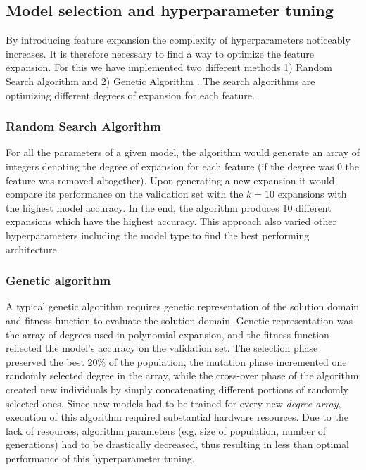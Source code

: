 \documentclass[10pt,conference,compsocconf]{IEEEtran}
\begin{document}
\subsection{Model selection and hyperparameter tuning}


\label{sec:model-selection}

By introducing feature expansion the complexity of hyperparameters noticeably increases. It is therefore necessary to find a way to optimize the feature expansion. For this we have implemented two different methods 1) Random Search algorithm and 2) Genetic Algorithm \cite{GenTut}. The search algorithms are optimizing different degrees of expansion for each feature.

\subsubsection{Random Search Algorithm}

For all the parameters of a given model, the algorithm would generate an array of integers denoting the degree of expansion for each feature (if the degree was 0 the feature was removed altogether). Upon generating a new expansion it would compare its performance on the validation set with the $k=10$ expansions with the highest model accuracy. In the end, the algorithm produces 10 different expansions which have the highest accuracy. This approach also varied other hyperparameters including the model type to find the best performing architecture.


\subsubsection{Genetic algorithm}

A typical genetic algorithm requires genetic representation of the solution domain and fitness function to evaluate the solution domain.
Genetic representation was the array of degrees used in polynomial expansion, and the fitness function reflected the model's accuracy on the validation set. The selection phase preserved the best 20\% of the population, the mutation phase incremented one randomly selected degree in the array, while the cross-over phase of the algorithm created new individuals by simply concatenating different portions of randomly selected ones. Since new models had to be trained for every new \textit{degree-array}, execution of this algorithm required substantial hardware resources. Due to the lack of resources, algorithm parameters (e.g. size of population, number of generations) had to be drastically decreased, thus resulting in less than optimal performance of this hyperparameter tuning.   
\end{document}
